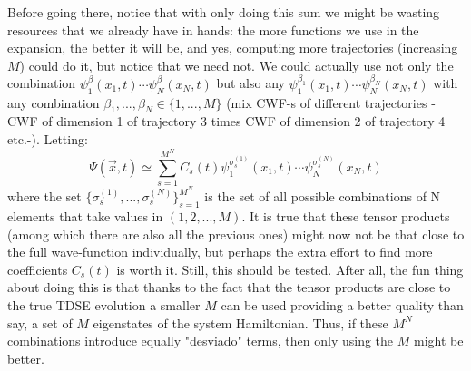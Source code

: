 \documentclass[11pt, a4paper]{article} %
\begin{document}
Before going there, notice that with only doing this sum we might be wasting resources that we already have in hands: the more functions we use in the expansion, the better it will be, and yes, computing more trajectories (increasing $M$) could do it, but notice that we need not. We could actually use not only the combination $\psi^\beta_1(x_1,t)\cdots \psi^\beta_N(x_N,t)$ but also any $\psi^{\beta_1}_1(x_1,t)\cdots \psi^{\beta_N}_N(x_N,t)$ with any combination $\beta_1,...,\beta_N \in \{1,...,M\}$ (mix CWF-s of different trajectories -CWF of dimension 1 of trajectory 3 times CWF of dimension 2 of trajectory 4 etc.-). Letting:
\begin{equation}\label{CWF.LinComb}\tag{CWF.LinComb}
\Psi(\vec{x},t)\simeq \sum_{s=1}^{M^N} C_s(t) \psi_1^{\sigma^{(1)}_s}(x_1,t)\cdots \psi_N^{\sigma^{(N)}_s}(x_N,t)
\end{equation}
where the set $\{\sigma^{(1)}_s, ..., \sigma^{(N)}_s\}_{s=1}^{M^N}$ is the set of all possible combinations of N elements that take values in $(1,2,..., M)$. It is true that these tensor products (among which there are also all the previous ones) might now not be that close to the full wave-function individually, but perhaps the extra effort to find more coefficients $C_s(t)$ is worth it. Still, this should be tested. After all, the fun thing about doing this is that thanks to the fact that the tensor products are close to the true TDSE evolution a smaller $M$ can be used providing a better quality than say, a set of $M$ eigenstates of the system Hamiltonian. Thus, if these $M^N$ combinations introduce equally "desviado" terms, then only using the $M$ might be better.
\end{document}
